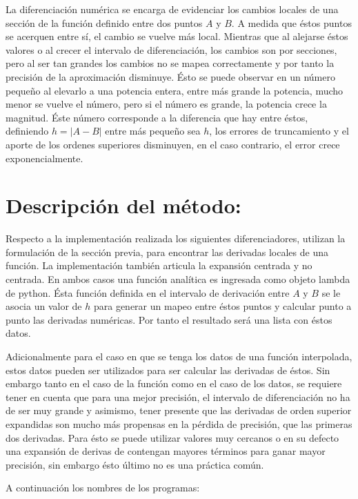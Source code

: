 \documentclass[letterpaper,10pt,oneside]{sphinxmanual}
\theoremstyle{plain}%
\theoremstyle{definition}%
\theoremstyle{remark}%
\begin{document}
La diferenciación numérica se encarga de evidenciar los cambios locales de una sección de la función definido entre dos puntos $A$ y $B$. A medida que éstos puntos se acerquen entre sí, el cambio se vuelve más local. Mientras que al alejarse éstos valores o al crecer el intervalo de diferenciación, los cambios son por secciones, pero al ser tan grandes los cambios no se mapea correctamente y por tanto la precisión de la aproximación disminuye. Ésto se puede observar en un número pequeño al elevarlo a una potencia entera, entre más grande la potencia, mucho menor se vuelve el número, pero si el número es grande, la potencia crece la magnitud. Éste número corresponde a la diferencia que hay entre éstos, definiendo $h = |A-B|$ entre más pequeño sea $h$, los errores de truncamiento y el aporte de los ordenes superiores disminuyen, en el caso contrario, el error crece exponencialmente.


\section{Descripción del método:}
\label{chapter03:descripción-del-método}

Respecto a la implementación realizada los siguientes diferenciadores, utilizan la formulación de la sección previa, para encontrar las derivadas locales de una función. La implementación también articula la expansión centrada y no centrada. En ambos casos una función analítica es ingresada como objeto lambda de python. Ésta función definida en el intervalo de derivación entre $A$ y $B$ se le asocia un valor de $h$ para generar un mapeo entre éstos puntos y calcular punto a punto las derivadas numéricas. Por tanto el resultado será una lista con éstos datos.

Adicionalmente para el caso en que se tenga los datos de una función interpolada, estos datos pueden ser utilizados para ser calcular las derivadas de éstos. Sin embargo tanto en el caso de la función como en el caso de los datos, se requiere tener en cuenta que para una mejor precisión, el intervalo de diferenciación no ha de ser muy grande y asimismo, tener presente que las derivadas de orden superior expandidas son mucho más propensas en la pérdida de precisión, que las primeras dos derivadas. Para ésto se puede utilizar valores muy cercanos o en su defecto una expansión de derivas de contengan mayores términos para ganar mayor precisión, sin embargo ésto último no es una práctica común.

A continuación los nombres de los programas:
\end{document}
